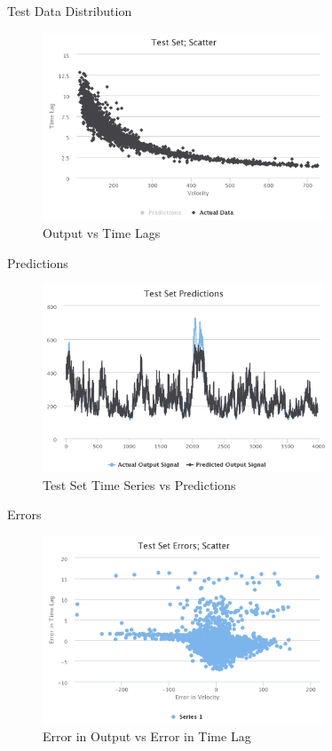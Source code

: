 \documentclass{beamer}
\begin{document}
\begin{frame}{Test Data Distribution}
    \begin{figure}[h]
        \includegraphics[width=0.75\textwidth]{data-scatter-iii.png}
        \caption{Output vs Time Lags}
        \label{fig:VelTimeLags-iii}
      \end{figure}
\end{frame}


\begin{frame}{Predictions}
    \begin{figure}[h]
        \includegraphics[width=0.75\textwidth]{predictions-iii.png}
        \caption{Test Set Time Series vs Predictions}
        \label{fig:predictions-iii}
      \end{figure}
\end{frame}

\begin{frame}{Errors}
    \begin{figure}[h]
        \includegraphics[width=0.75\textwidth]{errors-iii.png}
        \caption{Error in Output vs Error in Time Lag}
        \label{fig:errors-iii}
      \end{figure}
\end{frame}
\end{document}
